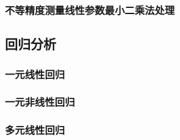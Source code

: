 \subsubsection{不等精度测量线性参数最小二乘法处理}
\subsection{回归分析}
\subsubsection{一元线性回归}
\subsubsection{一元非线性回归}
\subsubsection{多元线性回归}


















